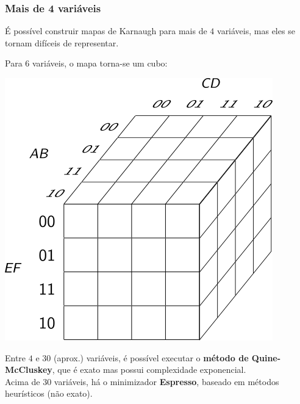 \documentclass{beamer}
\begin{document}
\begin{frame}
\frametitle{Mais de 4 variáveis}

\small

É possível construir mapas de Karnaugh para mais de $4$ variáveis,
mas eles se tornam difíceis de representar.

\vspace{6pt}\pause

Para 6 variáveis, o mapa torna-se um cubo:

\vspace{6pt}

{\centering
\includegraphics[scale=0.7]{images/kmap6var}\\}

\vspace{6pt}\pause

Entre $4$ e $30$ (aprox.) variáveis, é possível executar
o \textbf{método de Quine-McCluskey}, que é exato mas possui
complexidade exponencial.\\ \pause
Acima de $30$ variáveis, há o minimizador
\textbf{Espresso}, baseado em métodos heurísticos (não exato).

\end{frame}
\end{document}
